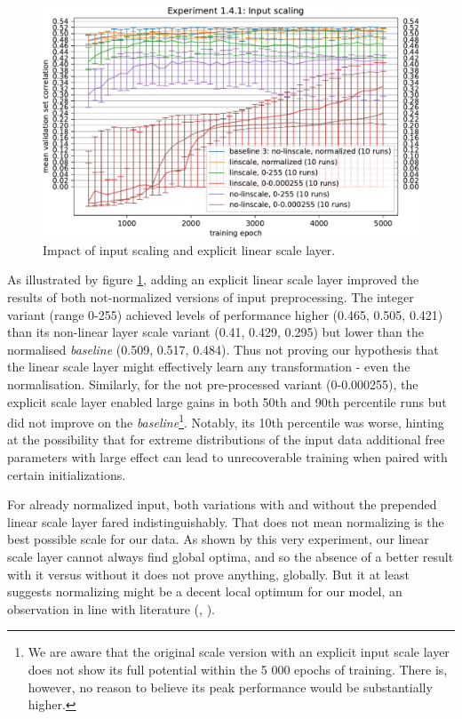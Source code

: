 \begin{figure}[H]
    \centering
    \includegraphics[width=1\textwidth]{../figures/05_1_4_1}
    \caption[Experiment 1.4.1]{Impact of input scaling and explicit linear scale layer.}
    \label{fig:5.1.4.1}
\end{figure}

As illustrated by figure \ref{fig:5.1.4.1}, adding an explicit linear scale layer improved the results of both not-normalized versions of input preprocessing. The integer variant (range 0-255) achieved levels of performance higher (0.465, 0.505, 0.421) than its non-linear layer scale variant (0.41, 0.429, 0.295) but lower than the normalised \textit{baseline} (0.509, 0.517, 0.484). Thus not proving our hypothesis that the linear scale layer might effectively learn any transformation - even the normalisation. Similarly, for the not pre-processed variant (0-0.000255), the explicit scale layer enabled large gains in both 50th and 90th percentile runs but did not improve on the \textit{baseline}\footnote{We are aware that the original scale version with an explicit input scale layer does not show its full potential within the 5 000 epochs of training. There is, however, no reason to believe its peak performance would be substantially higher.}. Notably, its 10th percentile was worse, hinting at the possibility that for extreme distributions of the input data additional free parameters with large effect can lead to unrecoverable training when paired with certain initializations.

For already normalized input, both variations with and without the prepended linear scale layer fared indistinguishably. That does not mean normalizing is the best possible scale for our data. As shown by this very experiment, our linear scale layer cannot always find global optima, and so the absence of a better result with it versus without it does not prove anything, globally. But it at least suggests normalizing might be a decent local optimum for our model, an observation in line with literature (\citep{Goodfellow-et-al-2016}, \citep{Jin2015}).


